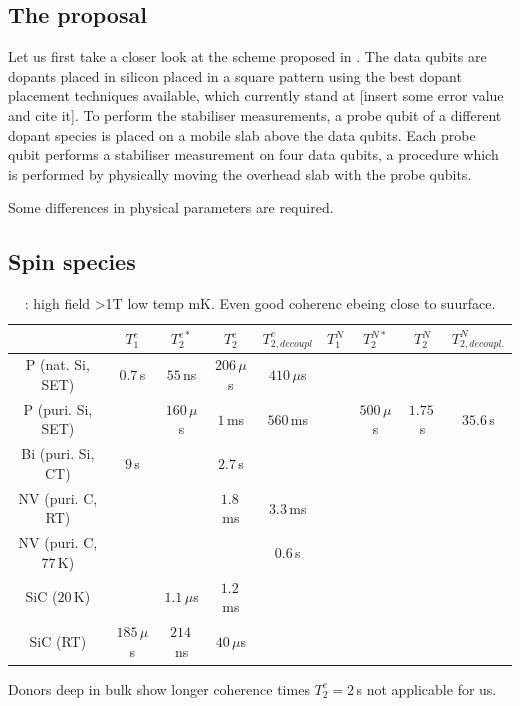 \documentclass[%
 reprint,
 amsmath,amssymb,
 aps,
]{revtex4-1}
\begin{document}
\subsection{The proposal}
Let us first take a closer look at the scheme proposed in \cite{the paper}. The data qubits are dopants placed in silicon placed in a square pattern using the best dopant placement techniques available, which currently stand at [insert some error value and cite it]. To perform the stabiliser measurements, a probe qubit of a different dopant species is placed on a mobile slab above the data qubits. Each probe qubit performs a stabiliser measurement on four data qubits, a procedure which is performed by physically moving the overhead slab with the probe qubits. 

Some differences in physical parameters are required. 

\subsection{Spin species}

\begin{table}
\begin{tabular}{ccccccccc}
	& $T_1^e$ & $T_2^{e*}$ & $T_2^e$ & $T_{2, decoupl}^e$ & $T_1^N$ & $T_2^{N*}$ & $T_2^N$ & $T_{2, decoupl.}^N$\\ \hline
P (nat. Si, SET) \cite{Pla2012}& $0.7\, $s & $55\, $ns  & $206\, \mu$s & $410\, \mu$s &  & & \\
P (puri. Si, SET) \cite{Muhonen2014}&  & $160\, \mu$s  & $1\, $ms & $560\, $ms & & $500\, \mu$s & $1.75\, $s & $35.6\, $s \\
Bi (puri. Si, CT) \cite{Wolfowicz2013} & $9\, $s &  & $2.7\, $s && && &\\
NV (puri. C, RT) \cite{Balasubramanian2009,Bar-Gill2013} & & & $1.8\, $ms & $3.3\, $ms && &&\\
NV (puri. C, $77\, $K) \cite{Bar-Gill2013} & & &  & $0.6\, $s && &&\\
SiC ($20\, $K) \cite{Christle2014} & & $1.1\, \mu$s & $1.2\, $ms & && && \\
SiC (RT) \cite{Koehl2011} & $185\, \mu$s & $214\, $ns & $40\, \mu$s &  & & && \\
\hline
\end{tabular} 
\label{lala}
\caption{\cite{Pla2012,Muhonen2014}: high field >1T low temp mK. Even good coherenc ebeing close to suurface.}
\end{table}

Donors deep in bulk show longer coherence times $T_2^e=2\, $s \cite{Tyryshkin2011} not applicable for us.
\end{document}
